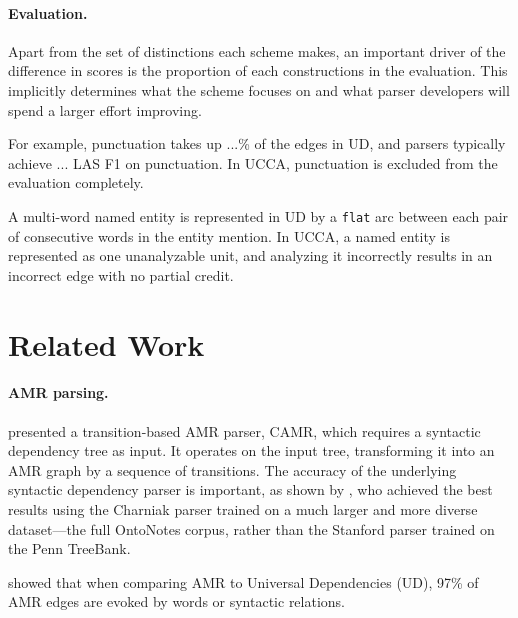 \documentclass[11pt,a4paper]{article}
\begin{document}
\paragraph{Evaluation.}

Apart from the set of distinctions each scheme makes,
an important driver of the difference in scores is the proportion of each constructions
in the evaluation.
This implicitly determines what the scheme focuses on and what parser developers
will spend a larger effort improving.

For example, punctuation takes up ...\% of the edges in UD,
and parsers typically achieve ... LAS F1 on punctuation.
In UCCA, punctuation is excluded from the evaluation completely.

A multi-word named entity is represented in UD by a \verb|flat| arc between
each pair of consecutive words in the entity mention.
In UCCA, a named entity is represented as one unanalyzable unit, and analyzing it
incorrectly results in an incorrect edge with no partial credit.

\section{Related Work}\label{sec:related_work}

\paragraph{AMR parsing.}

presented a transition-based AMR parser, CAMR, which requires a
syntactic dependency tree as input.
It operates on the input tree, transforming it into an AMR graph
by a sequence of transitions.
The accuracy of the underlying syntactic dependency parser is important,
as shown by ,
who achieved the best results using the Charniak parser trained on a
much larger and more diverse dataset---the full OntoNotes corpus,
rather than the Stanford parser trained on the Penn TreeBank.

 showed that when comparing AMR to Universal Dependencies (UD),
97\% of AMR edges are evoked by words or syntactic relations.


\end{document}
